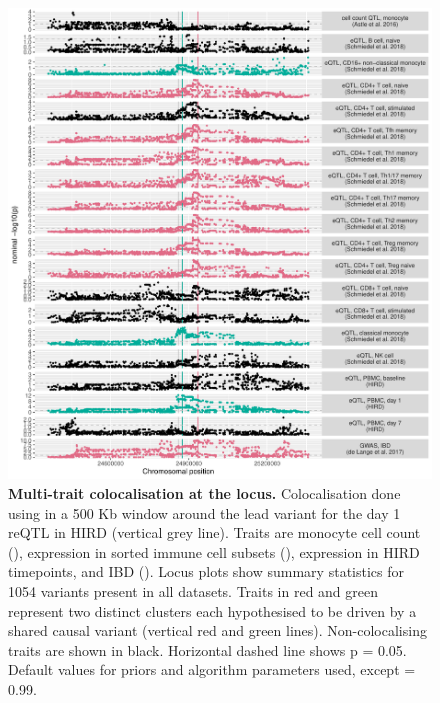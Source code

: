 \begin{figure}
    \centering
    \includegraphics[width=1.0\textwidth,page=1]{mainmatter/figures/chapter_03/perform_coloc.gene_ENSG00000138031.locusPlot.pdf}
    \caption{
        \textbf{Multi-trait colocalisation at the  locus.}
        Colocalisation done using  \autocite{foley2019FastEfficientColocalization} in a 500 Kb window around the lead variant for the day 1  \gls{reQTL} in \gls{HIRD} (vertical grey line).
        Traits are monocyte cell count (\textcite{astle2016AllelicLandscapeHuman}),  expression in sorted immune cell subsets (\textcite{schmiedel2018ImpactGeneticPolymorphisms}),  expression in \gls{HIRD} timepoints, and \gls{IBD} (\textcite{delange2017GenomewideAssociationStudy}).
        Locus plots show summary statistics for 1054 variants present in all datasets.
        Traits in red and green represent two distinct clusters each hypothesised to be driven by a shared causal variant (vertical red and green lines).
        Non-colocalising traits are shown in black.
        Horizontal dashed line shows p = 0.05.
        Default values for priors and algorithm parameters used, except  = 0.99.
    }
    \label{fig:hird_reQTL_coloc_ADCY3_locusPlot}
\end{figure}

